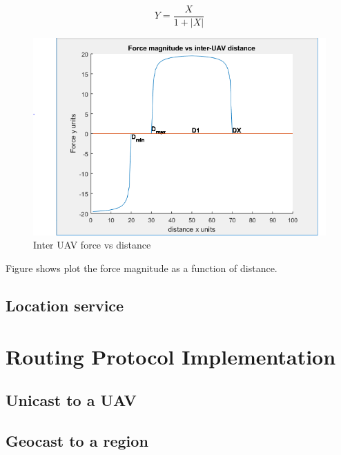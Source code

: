 \begin{equation}
    Y = \frac{X}{1 + |X|}
\end{equation}
\begin{figure}
\centering
\includegraphics[width=1\textwidth]{ncsuthesis-0.6/Chapter-4/figs/force_function}
\caption{Inter UAV force vs distance}
\label{fig:force_fn}
\end{figure}
Figure  shows plot the force magnitude as a function of distance.

\subsection{Location service} \label{loc_service_impl}
\section{Routing Protocol Implementation}
\subsection{Unicast to a UAV}
\subsection{Geocast to a region}
